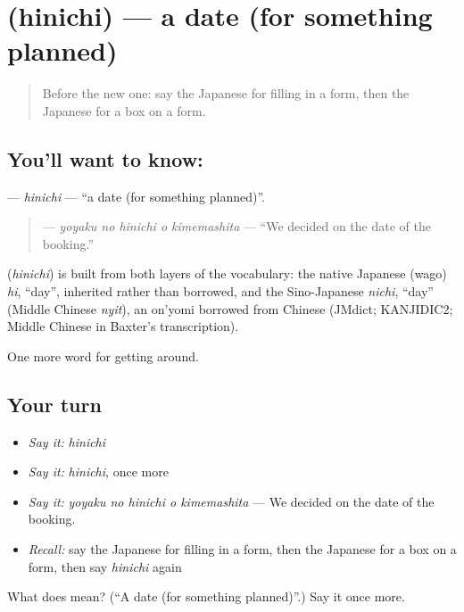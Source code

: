 \section[\texorpdfstring{\ja{ひにち} (hinichi)}{ひにち (hinichi)}]{ (hinichi) — a date (for something planned)}

\label{lesson:JA-C418-hinichi}



\begin{quote}
Before the new one: say the Japanese for filling in a form, then the Japanese for a box on a form.
\end{quote}

\subsection*{You'll want to know: }
\textbf{} — \emph{hinichi} — \textquotedblleft{}a date (for something planned)\textquotedblright{}.

\begin{quote}
\textbf{  } — \emph{yoyaku no hinichi o kimemashita} — \textquotedblleft{}We decided on the date of the booking.\textquotedblright{}
\end{quote}

\begin{cousinweb}
\textbf{} (\emph{hinichi}) is built from both layers of the vocabulary: the native Japanese (wago) \emph{hi}, \textquotedblleft{}day\textquotedblright{}, inherited rather than borrowed, and the Sino-Japanese \emph{nichi}, \textquotedblleft{}day\textquotedblright{} (Middle Chinese \emph{nyit}), an on'yomi borrowed from Chinese (JMdict; KANJIDIC2; Middle Chinese in Baxter's transcription).
\end{cousinweb}

\begin{grammarlens}[title={What you've built}]
One more word for getting around.
\end{grammarlens}

\subsection*{Your turn}
\begin{itemize}
\raggedright
  \item \emph{Say it:} \emph{hinichi}
  \item \emph{Say it:} \emph{hinichi}, once more
  \item \emph{Say it:} \emph{yoyaku no hinichi o kimemashita} — We decided on the date of the booking.
  \item \emph{Recall:} say the Japanese for filling in a form, then the Japanese for a box on a form, then say \emph{hinichi} again
\end{itemize}

\begin{tcolorbox}[breakable,colback=teal!4,colframe=teal!35!black,title={Before you move on}]
What does  mean? (\textquotedblleft{}A date (for something planned)\textquotedblright{}.) Say it once more.
\end{tcolorbox}

